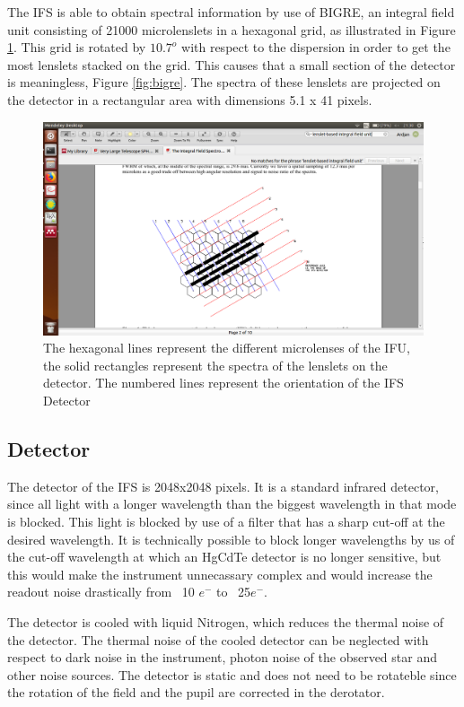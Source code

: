 \documentclass[twoside,single]{lion-msc}
\begin{document}
The IFS is able to obtain spectral information by use of BIGRE, an integral field unit consisting of 21000 microlenslets in a hexagonal grid, as illustrated in Figure \ref{fig:bigregrid}. This grid is rotated by $10.7^o$ with respect to the dispersion in order to get the most lenslets stacked on the grid. This causes that a small section of the detector is meaningless, Figure \ref{fig:bigre}. The spectra of these lenslets are projected on the detector in a rectangular area with dimensions 5.1 x 41 pixels. 


\begin{figure}[htbp]
\centering 
\includegraphics[trim={15cm 1.5cm 10cm 8cm},clip,scale = 0.47]{bigregrid}
\caption{The hexagonal lines represent the different microlenses of the IFU, the solid rectangles represent the spectra of the lenslets on the detector. The numbered lines  represent the orientation of the IFS Detector \cite{Claudi2008}} 
\label{fig:bigregrid}
\end{figure}

\subsection{Detector}
The detector of the IFS is 2048x2048 pixels. It is a standard infrared detector, since all light with a longer wavelength than the biggest wavelength in that mode is blocked. This light is blocked by use of a filter that has a sharp cut-off at the desired wavelength. It is technically possible to block longer wavelengths by us of the cut-off wavelength at which an HgCdTe detector is no longer sensitive, but this would make the instrument unnecassary complex and would increase the readout noise drastically from ~10 $e^-$ to ~25$e^-$\citep{Claudi2008}.
\bigskip

The detector is cooled with liquid Nitrogen, which reduces the thermal noise of the detector. The thermal noise of the cooled detector can be neglected with respect to dark noise in the instrument, photon noise of the observed star and other noise sources\citep{Claudi2008}. The detector is static and does not need to be rotateble since the rotation of the field and the pupil are corrected in the derotator. 
\end{document}
